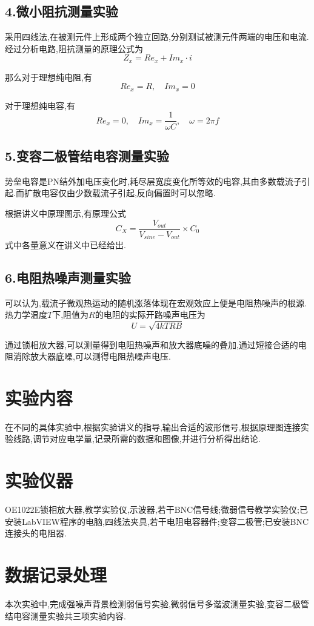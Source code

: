 \documentclass{article}
\begin{document}
\subsection*{4.微小阻抗测量实验}
采用四线法,在被测元件上形成两个独立回路,分别测试被测元件两端的电压和电流.经过分析电路,阻抗测量的原理公式为$$Z_{x}=Re_{x}+Im_{x}\cdot i$$

那么对于理想纯电阻,有$$Re_{x}=R,\quad Im_{x}=0$$

对于理想纯电容,有$$Re_{x}=0,\quad Im_{x}=\frac{1}{\omega C},\quad\omega=2\pi f$$

\subsection*{5.变容二极管结电容测量实验}
势垒电容是PN结外加电压变化时,耗尽层宽度变化所等效的电容,其由多数载流子引起.而扩散电容仅由少数载流子引起,反向偏置时可以忽略.

根据讲义中原理图示,有原理公式$$C_{X}=\frac{V_{out}}{V_{sine}-V_{out}}\times C_{0}$$式中各量意义在讲义中已经给出.

\subsection*{6.电阻热噪声测量实验}
可以认为,载流子微观热运动的随机涨落体现在宏观效应上便是电阻热噪声的根源.热力学温度$T$下,阻值为$R$的电阻的实际开路噪声电压为$$U=\sqrt{4kTRB}$$

通过锁相放大器,可以测量得到电阻热噪声和放大器底噪的叠加,通过短接合适的电阻消除放大器底噪,可以测得电阻热噪声电压.

\section*{实验内容}
在不同的具体实验中,根据实验讲义的指导,输出合适的波形信号,根据原理图连接实验线路,调节对应电学量,记录所需的数据和图像,并进行分析得出结论.



\section*{实验仪器}
OE1022E锁相放大器,教学实验仪,示波器,若干BNC信号线;微弱信号教学实验仪;已安装LabVIEW程序的电脑,四线法夹具,若干电阻电容器件;变容二极管;已安装BNC连接头的电阻器.

\section*{数据记录处理}
本次实验中,完成强噪声背景检测弱信号实验,微弱信号多谐波测量实验,变容二极管结电容测量实验共三项实验内容.
\end{document}
